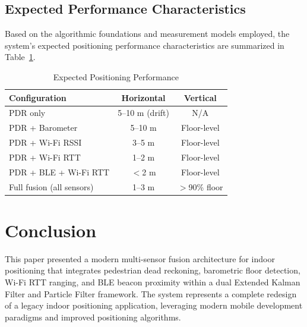 \documentclass[journal,twocolumn]{IEEEtran}
\begin{document}
\subsection{Expected Performance Characteristics}

Based on the algorithmic foundations and measurement models employed, the system's expected positioning performance characteristics are summarized in Table~\ref{tab:performance}.

\begin{table}[htbp]
\caption{Expected Positioning Performance}
\label{tab:performance}
\centering
\begin{tabular}{@{}lcc@{}}
\toprule
\textbf{Configuration} & \textbf{Horizontal} & \textbf{Vertical} \\
\midrule
PDR only & 5--10 m (drift) & N/A \\
PDR + Barometer & 5--10 m & Floor-level \\
PDR + Wi-Fi RSSI & 3--5 m & Floor-level \\
PDR + Wi-Fi RTT & 1--2 m & Floor-level \\
PDR + BLE + Wi-Fi RTT & $<$2 m & Floor-level \\
Full fusion (all sensors) & 1--3 m & $>$90\% floor \\
\bottomrule
\end{tabular}
\end{table}

\section{Conclusion}
\label{sec:conclusion}

This paper presented a modern multi-sensor fusion architecture for indoor positioning that integrates pedestrian dead reckoning, barometric floor detection, Wi-Fi RTT ranging, and BLE beacon proximity within a dual Extended Kalman Filter and Particle Filter framework. The system represents a complete redesign of a legacy indoor positioning application, leveraging modern mobile development paradigms and improved positioning algorithms.
\end{document}
